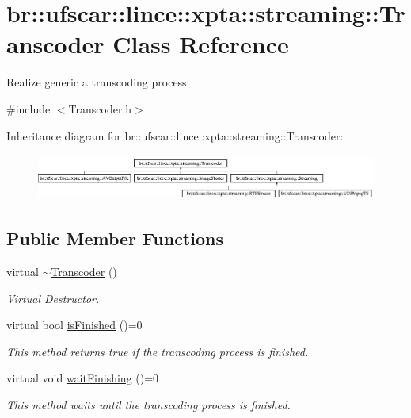 \hypertarget{classbr_1_1ufscar_1_1lince_1_1xpta_1_1streaming_1_1Transcoder}{
\section{br::ufscar::lince::xpta::streaming::Transcoder Class Reference}
\label{classbr_1_1ufscar_1_1lince_1_1xpta_1_1streaming_1_1Transcoder}
}


Realize generic a transcoding process.  




{\ttfamily \#include $<$Transcoder.h$>$}

Inheritance diagram for br::ufscar::lince::xpta::streaming::Transcoder:\begin{figure}[H]
\begin{center}
\leavevmode
\includegraphics[height=1.51079cm]{classbr_1_1ufscar_1_1lince_1_1xpta_1_1streaming_1_1Transcoder}
\end{center}
\end{figure}
\subsection*{Public Member Functions}
\begin{DoxyCompactItemize}
\item 
virtual \hyperlink{classbr_1_1ufscar_1_1lince_1_1xpta_1_1streaming_1_1Transcoder_a12f89baf6afdfa76505494a99b30d730}{$\sim$Transcoder} ()
\begin{DoxyCompactList}\small\item\em Virtual Destructor. \item\end{DoxyCompactList}\item 
virtual bool \hyperlink{classbr_1_1ufscar_1_1lince_1_1xpta_1_1streaming_1_1Transcoder_aceabe1e9bb931313d5a52a53b9ab4af6}{isFinished} ()=0
\begin{DoxyCompactList}\small\item\em This method returns true if the transcoding process is finished. \item\end{DoxyCompactList}\item 
virtual void \hyperlink{classbr_1_1ufscar_1_1lince_1_1xpta_1_1streaming_1_1Transcoder_ac060d2266b2b4b41b1f62eb0c6a48be3}{waitFinishing} ()=0
\begin{DoxyCompactList}\small\item\em This method waits until the transcoding process is finished. \item\end{DoxyCompactList}\end{DoxyCompactItemize}
